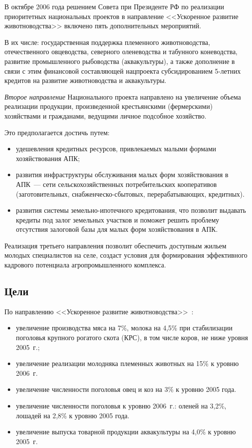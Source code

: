 \documentclass[article, 12pt, russian, oneside]{ncc}
\begin{document}
В октябре 2006 года решением Совета при Президенте РФ по реализации
приоритетных национальных проектов в направление <<Ускоренное развитие
животноводства>> включено пять дополнительных мероприятий.

В их числе: государственная поддержка племенного животноводства,
отечественного овцеводства, северного оленеводства и табунного
коневодства, развитие промышленного рыбоводства (аквакультуры), а
также дополнение в связи с этим финансовой составляющей нацпроекта
субсидированием 5-летних кредитов на развитие животноводства и
аквакультуры.

\emph{Второе направление} Национального проекта направлено на
увеличение объема реализации продукции, произведенной крестьянскими
(фермерскими) хозяйствами и гражданами, ведущими личное подсобное
хозяйство.

Это предполагается достичь путем:

\begin{itemize}
\item удешевления кредитных ресурсов, привлекаемых малыми формами
  хозяйствования АПК;
\item развития инфраструктуры обслуживания малых форм хозяйствования в
  АПК~--- сети сельскохозяйственных потребительских кооперативов
  (заготовительных, снабженческо-сбытовых, перерабатывающих,
  кредитных).
\item развития системы земельно-ипотечного кредитования, что позволит
  выдавать кредиты под залог земельных участков и поможет решить
  проблему отсутствия залоговой базы для малых форм хозяйствования в
  АПК.
\end{itemize}

Реализация третьего направления позволит обеспечить доступным жильем
молодых специалистов на селе, создаст условия для формирования
эффективного кадрового потенциала агропромышленного комплекса.

\subsection{Цели}

По направлению <<Ускоренное развитие
животноводства>>~\cite{APK_Goals}:

\begin{itemize}
\item увеличение производства мяса на 7\%, молока на 4,5\% при
  стабилизации поголовья крупного рогатого скота (КРС), в том числе
  коров, не ниже уровня 2005~г.;
\item увеличение реализации молодняка племенных животных на 15\% к
  уровню 2006~г.
\item увеличение численности поголовья овец и коз на 3\% к уровню 2005
  года.
\item увеличение численности поголовья к уровню 2006~г.: оленей на
  3,2\%, лошадей на 2,8\% к уровню 2005 года.
\item увеличение выпуска товарной продукции аквакультуры на 4,0\% к
  уровню 2005~г.
\end{itemize}
\end{document}
